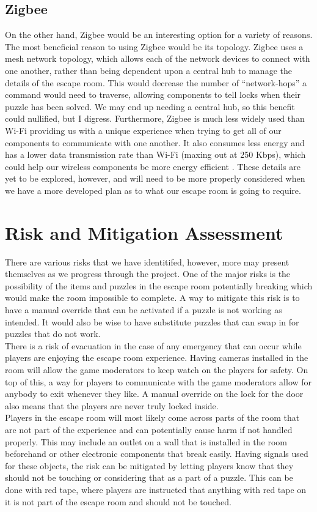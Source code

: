 \documentclass[conference]{IEEEtran}
\begin{document}
\subsection*{Zigbee}
On the other hand, Zigbee would be an interesting option for a variety of reasons. The most beneficial reason to using
Zigbee would be its topology. Zigbee uses a mesh network topology, which allows each of the network devices to connect with
one another, rather than being dependent upon a central hub to manage the details of the escape room. This would decrease
the number of ``network-hops'' a command would need to traverse, allowing components to tell locks when their puzzle has been
solved. We may end up needing a central hub, so this benefit could nullified, but I digress. Furthermore, Zigbee is much less
widely used than Wi-Fi providing us with a unique experience when trying to get all of our components to communicate
with one another. It also consumes less energy and has a lower data transmission rate than Wi-Fi (maxing out at 250 Kbps),
which could help our wireless components be more energy efficient \cite{wifiVsZigbee}. These details are yet to be explored,
however, and will need to be more properly considered when we have a more developed plan as to what our escape room is going to require.

\section{Risk and Mitigation Assessment}
There are various risks that we have identitifed, however, more may present
themselves as we progress through the project. One of the major risks is
the possibility of the items and puzzles in the escape room potentially
breaking which would make the room impossible to complete. A way
to mitigate this risk is to have a manual override that can be activated
if a puzzle is not working as intended. It would also be wise to have
substitute puzzles that can swap in for puzzles that do not work.
\\
\indent There is a risk of evacuation in the case of any emergency that can occur
while players are enjoying the escape room experience. Having cameras
installed in the room will allow the game moderators to keep watch on
the players for safety. On top of this, a way for players to communicate
with the game moderators allow for anybody to exit whenever they like.
A manual override on the lock for the door also means that the
players are never truly locked inside.
\\
\indent Players in the escape room will most likely come across parts of the room
that are not part of the experience and can potentially cause harm if not
handled properly. This may include an outlet on a wall that is installed
in the room beforehand or other electronic components that break easily.
Having signals used for these objects, the risk can be mitigated by letting
players know that they should not be touching or considering that as a
part of a puzzle. This can be done with red tape, where players are instructed
that anything with red tape on it is not part of the escape room and should
not be touched.
\end{document}
